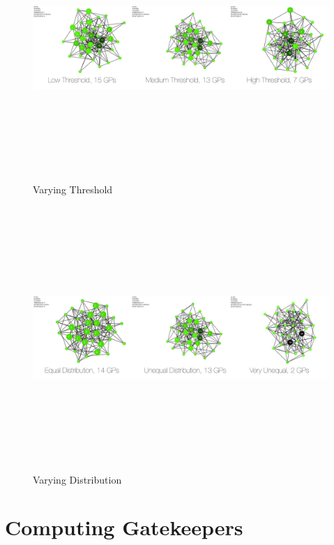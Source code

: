 \documentclass[a4paper]{article}
\begin{document}
\begin{figure}[]
\centering
\includegraphics[width=250mm, height = 100mm, angle  = 90]{Threshold.jpg}
\caption{Varying Threshold \label{th}}
\end{figure}

\begin{figure}[]
\centering
\includegraphics[width=250mm, height = 100mm,angle = 90]{Distribution.jpg}
\caption{Varying Distribution \label{di}}
\end{figure}

\section*{Computing Gatekeepers}
\end{document}
